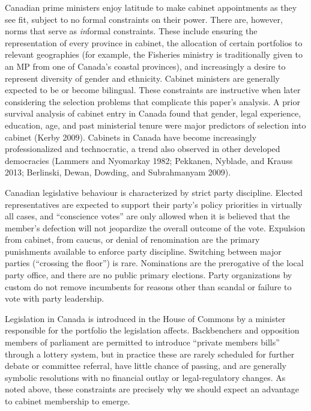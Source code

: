 \documentclass[letter,12pt]{article}
\begin{document}
Canadian prime ministers enjoy latitude to make cabinet appointments as they see fit, subject to no formal constraints on their power. There are, however, norms that serve as \textit{in}formal constraints. These include ensuring the representation of every province in cabinet, the allocation of certain portfolios to relevant geographies (for example, the Fisheries ministry is traditionally given to an MP from one of Canada's coastal provinces), and increasingly a desire to represent diversity of gender and ethnicity. Cabinet ministers are generally expected to be or become bilingual. These constraints are instructive when later considering the selection problems that complicate this paper's analysis. A prior survival analysis of cabinet entry in Canada found that gender, legal experience, education, age, and past ministerial tenure were major predictors of selection into cabinet (Kerby 2009). Cabinets in Canada have become increasingly professionalized and technocratic, a trend also observed in other developed democracies (Lammers and Nyomarkay 1982; Pekkanen, Nyblade, and Krauss 2013; Berlinski, Dewan, Dowding, and Subrahmanyam 2009).

Canadian legislative behaviour is characterized by strict party discipline. Elected representatives are expected to support their party's policy priorities in virtually all cases, and ``conscience votes'' are only allowed when it is believed that the member's defection will not jeopardize the overall outcome of the vote. Expulsion from cabinet, from caucus, or denial of renomination are the primary punishments available to enforce party discipline. Switching between major parties (``crossing the floor'') is rare. Nominations are the prerogative of the local party office, and there are no public primary elections. Party organizations by custom do not remove incumbents for reasons other than scandal or failure to vote with party leadership. 

Legislation in Canada is introduced in the House of Commons by a minister responsible for the portfolio the legislation affects. Backbenchers and opposition members of parliament are permitted to introduce ``private members bills'' through a lottery system, but in practice these are rarely scheduled for further debate or committee referral, have little chance of passing, and are generally symbolic resolutions with no financial outlay or legal-regulatory changes. As noted above, these constraints are precisely why we should expect an advantage to cabinet membership to emerge.
\end{document}
